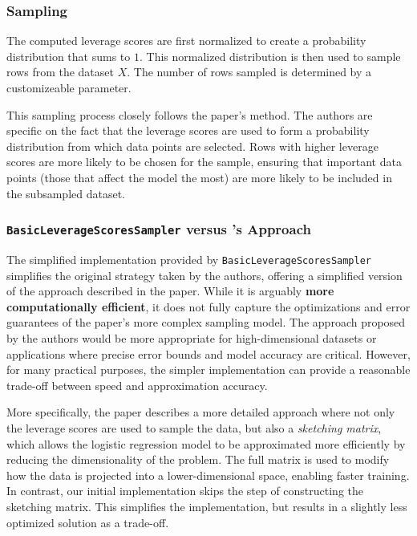 \documentclass{article}
\theoremstyle{plain}
\theoremstyle{definition}
\theoremstyle{remark}
\begin{document}
\subsubsection{Sampling}

The computed leverage scores are first normalized to create a probability distribution that sums to $1$. This normalized distribution is then used to sample rows from the dataset $X$. The number of rows sampled is determined by a customizeable parameter.

This sampling process closely follows the paper’s method. The authors are specific on the fact that the leverage scores are used to form a probability distribution from which data points are selected. Rows with higher leverage scores are more likely to be chosen for the sample, ensuring that important data points (those that affect the model the most) are more likely to be included in the subsampled dataset.

\subsubsection{\texttt{BasicLeverageScoresSampler} versus \citeauthor{chow24}'s Approach}

The simplified implementation provided by \texttt{BasicLeverageScoresSampler} simplifies the original strategy taken by the authors, offering a simplified version of the approach described in the paper. While it is arguably \textbf{more computationally efficient}, it does not fully capture the optimizations and error guarantees of the paper's more complex sampling model. The approach proposed by the authors would be more appropriate for high-dimensional datasets or applications where precise error bounds and model accuracy are critical. However, for many practical purposes, the simpler implementation can provide a reasonable trade-off between speed and approximation accuracy.

More specifically, the paper describes a more detailed approach where not only the leverage scores are used to sample the data, but also a \textit{sketching matrix}, which allows the logistic regression model to be approximated more efficiently by reducing the dimensionality of the problem. The full matrix is used to modify how the data is projected into a lower-dimensional space, enabling faster training. In contrast, our initial implementation skips the step of constructing the sketching matrix. This simplifies the implementation, but results in a slightly less optimized solution as a trade-off.
\end{document}
